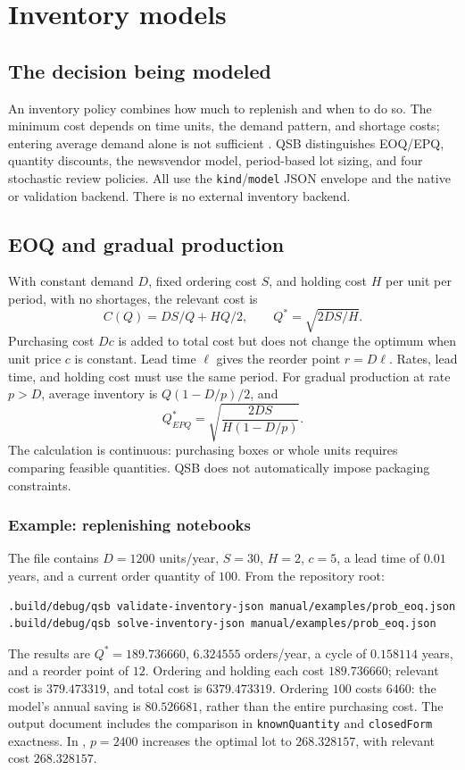 \chapter{Inventory models}
\label{ch:inventarios}

\section{The decision being modeled}
An inventory policy combines how much to replenish and when to do so. The
minimum cost depends on time units, the demand pattern, and shortage costs;
entering average demand alone is not sufficient
\cite{harris1913many,silver1998inventory}. QSB distinguishes EOQ/EPQ,
quantity discounts, the newsvendor model, period-based lot sizing, and four
stochastic review policies. All use the \texttt{kind}/\texttt{model} JSON
envelope and the native or validation backend. There is no external inventory
backend.

\section{EOQ and gradual production}
With constant demand \(D\), fixed ordering cost \(S\), and holding cost
\(H\) per unit per period, with no shortages, the relevant cost is
\[
 C(Q)=DS/Q+HQ/2,\qquad Q^*=\sqrt{2DS/H}.
\]
Purchasing cost \(Dc\) is added to total cost but does not change the optimum
when unit price \(c\) is constant. Lead time \(\ell\) gives the reorder
point \(r=D\ell\). Rates, lead time, and holding cost must use the same
period. For gradual production at rate \(p>D\), average inventory is
\(Q(1-D/p)/2\), and
\[
 Q^*_{EPQ}=\sqrt{\frac{2DS}{H(1-D/p)}}.
\]
The calculation is continuous: purchasing boxes or whole units requires
comparing feasible quantities. QSB does not automatically impose packaging
constraints.

\subsection{Example: replenishing notebooks}
The file  contains \(D=1200\)
units/year, \(S=30\), \(H=2\), \(c=5\), a lead time of \(0.01\)
years, and a current order quantity of \(100\). From the repository root:
\begin{lstlisting}
.build/debug/qsb validate-inventory-json manual/examples/prob_eoq.json
.build/debug/qsb solve-inventory-json manual/examples/prob_eoq.json
\end{lstlisting}
The results are \(Q^*=189.736660\), \(6.324555\) orders/year, a cycle of
\(0.158114\) years, and a reorder point of \(12\). Ordering and holding
each cost \(189.736660\); relevant cost is \(379.473319\), and total
cost is \(6379.473319\). Ordering \(100\) costs \(6460\): the model's
annual saving is \(80.526681\), rather than the entire purchasing cost.
The output document includes the comparison in \texttt{knownQuantity} and
\texttt{closedForm} exactness. In , \(p=2400\)
increases the optimal lot to \(268.328157\), with relevant cost
\(268.328157\).


